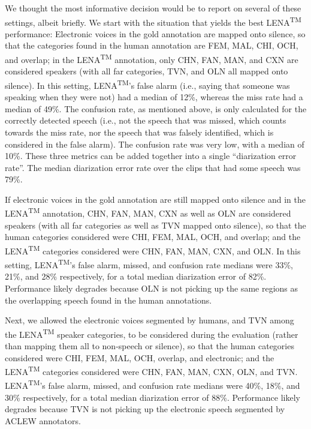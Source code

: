 \documentclass[english,floatsintext,man]{apa6}
\begin{document}
We thought the most informative decision would be to report on several
of these settings, albeit briefly. We start with the situation that
yields the best LENA\textsuperscript{TM} performance: Electronic voices
in the gold annotation are mapped onto silence, so that the categories
found in the human annotation are FEM, MAL, CHI, OCH, and overlap; in
the LENA\textsuperscript{TM} annotation, only CHN, FAN, MAN, and CXN are
considered speakers (with all far categories, TVN, and OLN all mapped
onto silence). In this setting, LENA\textsuperscript{TM}'s false alarm
(i.e., saying that someone was speaking when they were not) had a median
of 12\%, whereas the miss rate had a median of 49\%. The confusion rate,
as mentioned above, is only calculated for the correctly detected speech
(i.e., not the speech that was missed, which counts towards the miss
rate, nor the speech that was falsely identified, which is considered in
the false alarm). The confusion rate was very low, with a median of
10\%. These three metrics can be added together into a single
\enquote{diarization error rate}. The median diarization error rate over
the clips that had some speech was 79\%.

If electronic voices in the gold annotation are still mapped onto
silence and in the LENA\textsuperscript{TM} annotation, CHN, FAN, MAN,
CXN as well as OLN are considered speakers (with all far categories as
well as TVN mapped onto silence), so that the human categories
considered were CHI, FEM, MAL, OCH, and overlap; and the
LENA\textsuperscript{TM} categories considered were CHN, FAN, MAN, CXN,
and OLN. In this setting, LENA\textsuperscript{TM}'s false alarm,
missed, and confusion rate medians were 33\%, 21\%, and 28\%
respectively, for a total median diarization error of 82\%. Performance
likely degrades because OLN is not picking up the same regions as the
overlapping speech found in the human annotations.

Next, we allowed the electronic voices segmented by humans, and TVN
among the LENA\textsuperscript{TM} speaker categories, to be considered
during the evaluation (rather than mapping them all to non-speech or
silence), so that the human categories considered were CHI, FEM, MAL,
OCH, overlap, and electronic; and the LENA\textsuperscript{TM}
categories considered were CHN, FAN, MAN, CXN, OLN, and TVN.
LENA\textsuperscript{TM}'s false alarm, missed, and confusion rate
medians were 40\%, 18\%, and 30\% respectively, for a total median
diarization error of 88\%. Performance likely degrades because TVN is
not picking up the electronic speech segmented by ACLEW annotators.
\end{document}
